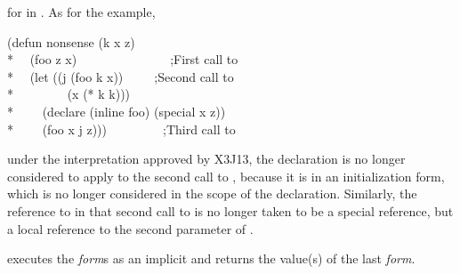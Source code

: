 \begin{defspec}
\begin{new}
for  in .  As for the  example,
\begin{lisp}
(defun nonsense (k x z) \\*
~~(foo z x)~~~~~~~~~~~~~~~;\textrm{First call to } \\*
~~(let ((j (foo k x))~~~~~;\textrm{Second call to } \\*
~~~~~~~~(x (* k k))) \\*
~~~~(declare (inline foo) (special x z)) \\*
~~~~(foo x j z)))~~~~~~~~~;\textrm{Third call to }
\end{lisp}
under the interpretation approved by X3J13, the 
declaration is no longer considered to apply to the second
call to , because it is in an initialization form, which is
no longer considered in the scope of the declaration.  Similarly,
the reference to  in that second call to  is no longer
taken to be a special reference, but a local reference to the second
parameter of .
\end{new}
\end{defspec}

 executes the \emph{form\/}s as an implicit
 and returns the value(s) of the last \emph{form}.

